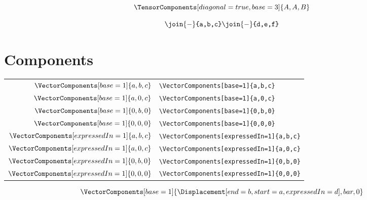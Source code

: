 \documentclass[10pt,a4paper]{article}
\begin{document}
\begin{equation}
\TensorComponents[diagonal=true,base=3]{A,A,B}
\end{equation}

\begin{equation}
\renewcommand*{\do}[1]{
    {
      \join{-}{#1}
    } \\
}
\docsvlist{{a,b,c},{d,e,f}}
\end{equation}

\section{Components}
\begin{tabular}{r|l}
$\VectorComponents[base=1]{a,b,c}$ & \verb+\VectorComponents[base=1]{a,b,c}+ \\
$\VectorComponents[base=1]{a,0,c}$ & \verb+\VectorComponents[base=1]{a,0,c}+ \\
$\VectorComponents[base=1]{0,b,0}$ & \verb+\VectorComponents[base=1]{0,b,0}+ \\
$\VectorComponents[base=1]{0,0,0}$ & \verb+\VectorComponents[base=1]{0,0,0}+ \\
$\VectorComponents[expressedIn=1]{a,b,c}$ & \verb+\VectorComponents[expressedIn=1]{a,b,c}+ \\
$\VectorComponents[expressedIn=1]{a,0,c}$ & \verb+\VectorComponents[expressedIn=1]{a,0,c}+ \\
$\VectorComponents[expressedIn=1]{0,b,0}$ & \verb+\VectorComponents[expressedIn=1]{0,b,0}+ \\
$\VectorComponents[expressedIn=1]{0,0,0}$ & \verb+\VectorComponents[expressedIn=1]{0,0,0}+ \\
\end{tabular}

\begin{equation}
 \def\foobarbaz{\Displacement[end=b,start=a,expressedIn=d]}
 \VectorComponents[base=1]{\foobarbaz,bar,0}
\end{equation}
\end{document}
